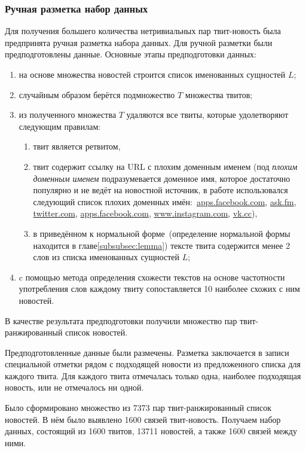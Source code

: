     \subsubsection{Ручная разметка набор данных}
        Для получения большего количества нетривиальных пар твит-новость была предпринята ручная разметка набора данных.
        Для ручной разметки были предподготовлены данные. Основные этапы предподготовки данных:
        \begin{enumerate}
            \item на основе множества новостей строится список именованных сущностей $L$;
            \item случайным образом берётся подмножество $T$ множества твитов;
            \item из полученного множества $T$ удаляются все твиты, которые удолетворяют следующим правилам:
            \begin{enumerate}
                \item твит является ретвитом,
                \item твит содержит ссылку на URL с плохим доменным именем (под \textit{плохим доменным именем} подразумевается доменное имя,
                которое достаточно популярно и не ведёт на новостной источник, в работе использовался следующий список плохих доменных имён:\
                \url{apps.facebook.com}, \url{ask.fm}, \url{twitter.com}, \url{apps.facebook.com}, \url{www.instagram.com}, \url{vk.cc}),
                \item в приведённом к нормальной форме~(определение нормальной формы находится в главе\ref{subsubsec:lemma}) тексте твита содержится менее 2 слов из списка именованных сущностей $L$;
            \end{enumerate}
            \item c помощью метода определения схожести текстов на основе частотности употребления слов каждому твиту сопоставляется 10 наиболее схожих с ним новостей.
        \end{enumerate}
        В качестве результата предподготовки получили множество пар твит-ранжированный список новостей.

        Предподготовленные данные были размечены.
        Разметка заключается в записи специальной отметки рядом с подходящей новости из предложенного списка для каждого твита.
        Для каждого твита отмечалась только одна, наиболее подходящая новость, или не отмечалось ни одной.

        Было сформировано множество из 7373 пар твит-ранжированный список новостей. В нём было выявлено 1600 связей твит-новость.
        Получаем набор данных, состоящий из 1600 твитов, 13711 новостей, а также 1600 связей между ними.

